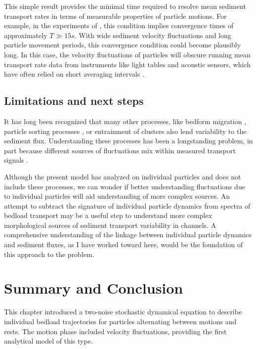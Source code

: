 This simple result provides the minimal time required to resolve mean sediment transport rates in terms of measurable properties of particle motions. For example, in the experiments of \citet{Martin2012}, this condition implies convergence times of approximately $T \gg 15 s$. With wide sediment velocity fluctuations and long particle movement periods, this convergence condition could become plausibly long.
In this case, the velocity fluctuations of particles will obscure running mean transport rate data from instruments like light tables and acoustic sensors, which have often relied on short averaging intervals \citep{Zimmermann2008,Tsakiris2014,Mendes2016}.

\subsection{Limitations and next steps}

It has long been recognized that many other processes, like bedform migration \citep{Hamamori1962,Guala2014}, particle sorting processes \citep{}, or entrainment of clusters \citep{Strom2004,Papanicolaou2018} also lend variability to the sediment flux.
Understanding these processes has been a longstanding problem, in part because different sources of fluctuations mix within measured transport signals \citep[e.g.][]{Hoey1992,Singh2009,Saletti2015,Dhont2018}.

Although the present model has analyzed on individual particles and does not include these processes, we can wonder if better understanding fluctuations due to individual particles will aid understanding of more complex sources.
An attempt to subtract the signature of individual particle dynamics from spectra of bedload transport may be a useful step to understand more complex morphological sources of sediment transport variability in channels.
A comprehensive understanding of the linkage between individual particle dynamics and sediment fluxes, as I have worked toward here, would be the foundation of this approach to the problem.

\section{Summary and Conclusion \label{sec:conc}} 
This chapter introduced a two-noise stochastic dynamical equation to describe individual bedload trajectories for particles alternating between motions and rests. The motion phase included velocity fluctuations, providing the first analytical model of this type.
 
